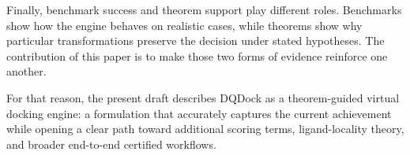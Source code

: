 Finally, benchmark success and theorem support play different roles. Benchmarks show how the engine behaves on realistic cases, while theorems show why particular transformations preserve the decision under stated hypotheses. The contribution of this paper is to make those two forms of evidence reinforce one another.

For that reason, the present draft describes DQDock as a theorem-guided virtual docking engine: a formulation that accurately captures the current achievement while opening a clear path toward additional scoring terms, ligand-locality theory, and broader end-to-end certified workflows.
